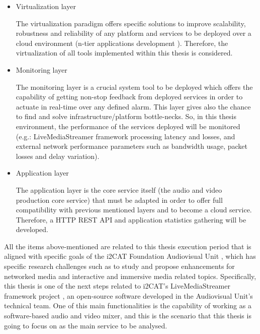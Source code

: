 \begin{itemize}
\item Virtualization layer \hfill 

The virtualization paradigm offers specific solutions to improve scalability, robustness and reliability of any platform and services to be deployed over a cloud environment (n-tier applications development \cite{n-tier architecture}). Therefore, the virtualization of all tools implemented within this thesis is considered.

\item Monitoring layer \hfill 

The monitoring layer is a crucial system tool to be deployed which offers the capability of getting non-stop feedback from deployed services in order to actuate in real-time over any defined alarm. This layer gives also the chance to find and solve infrastructure/platform bottle-necks. So, in this thesis environment, the performance of the services deployed will be monitored (e.g.: LiveMediaStreamer framework processing latency and losses, and external network performance parameters such as bandwidth usage, packet losses and delay variation).

\item Application layer \hfill 

The application layer is the core service itself (the audio and video production core service) that must be adapted in order to offer full compatibility with previous mentioned layers and to become a cloud service. Therefore, a HTTP REST API and application statistics gathering will be developed.

\end{itemize}

All the items above-mentioned are related to this thesis execution period that is aligned with specific goals of the i2CAT Foundation Audiovisual Unit \cite{i2catua}, which has specific research challenges such as to study and propose enhancements for networked media and interactive and immersive media related topics. Specifically, this thesis is one of the next steps related to i2CAT's LiveMediaStreamer framework project \cite{lmsGITHUB}, an open-source software developed in the Audiovisual Unit's technical team. One of this main functionalities is the capability of working as a software-based audio and video mixer, and this is the scenario that this thesis is going to focus on as the main service to be analysed.

